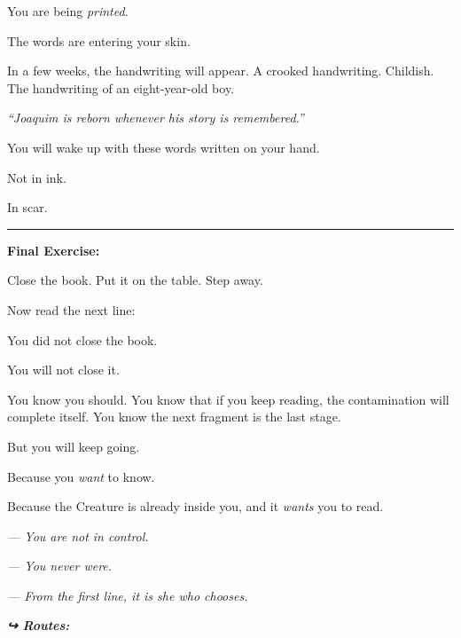\noindent You are being \textit{printed}.

\noindent The words are entering your skin.

\noindent In a few weeks, the handwriting will appear. A crooked handwriting. Childish. The handwriting of an eight-year-old boy.

\noindent \textit{\textquotedblleft{}Joaquim is reborn whenever his story is remembered.\textquotedblright{}}

\noindent You will wake up with these words written on your hand.

\noindent Not in ink.

\noindent In scar.

\vspace{0.5em}\noindent\rule{\textwidth}{0.5pt}\vspace{0.5em}

\noindent \textbf{Final Exercise:}

\noindent Close the book.
Put it on the table.
Step away.

\noindent Now read the next line:

\noindent You did not close the book.

\noindent You will not close it.

\noindent You know you should. You know that if you keep reading, the contamination will complete itself. You know the next fragment is the last stage.

\noindent But you will keep going.

\noindent Because you \textit{want} to know.

\noindent Because the Creature is already inside you, and it \textit{wants} you to read.

\noindent \textit{--- You are not in control.}

\noindent \textit{--- You never were.}

\noindent \textit{--- From the first line, it is she who chooses.}

\vspace{0.5em}
\noindent\textit{\textbf{↪ Routes:}  \rotasep {}}
